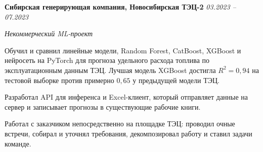 \textbf{Сибирская генерирующая компания, Новосибирская ТЭЦ-2} \hfill \emph{03.2023 -- 07.2023}
	
\textit{Некоммерческий ML-проект}
\begin{cvitems}
    \item Обучил и сравнил линейные модели, Random Forest, CatBoost, XGBoost и нейросеть на PyTorch для прогноза удельного расхода топлива по эксплуатационным данным ТЭЦ. Лучшая модель XGBoost достигла $R^2 = 0{,}94$ на тестовой выборке против примерно $0{,}65$ у предыдущей модели ТЭЦ.
    \item Разработал API для инференса и Excel-клиент, который отправляет данные на сервер и записывает прогнозы в существующие рабочие книги.
    \item Работал с заказчиком непосредственно на площадке ТЭЦ: проводил очные встречи, собирал и уточнял требования, декомпозировал работу и ставил задачи команде.
\end{cvitems}
